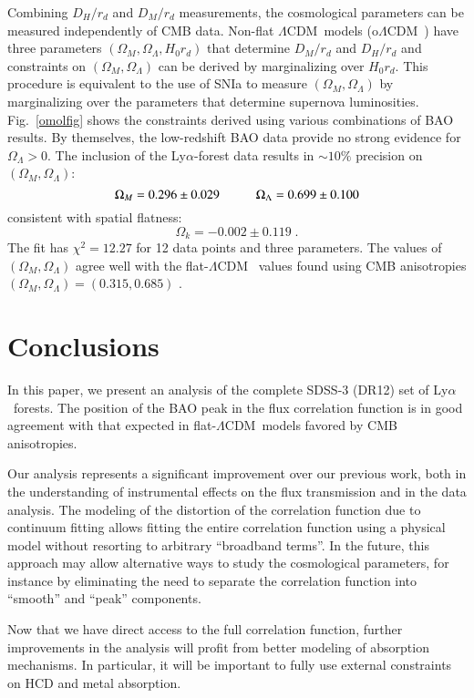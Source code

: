 \documentclass{aa}
\newcommand{\lya}{Ly$\alpha$}
\newcommand{\Lya}{Ly$\alpha$~}
\newcommand{\om}{\Omega_M}
\newcommand{\ol}{\Omega_\Lambda}
\newcommand{\DM}{D_M}
\newcommand{\DHub}{D_H}
\newcommand{\lcdm}{$\Lambda$CDM~}
\begin{document}
Combining $\DHub/r_d$ and  $\DM/r_d$ measurements,
the cosmological parameters can be measured 
independently of CMB data.
Non-flat \lcdm models (o\lcdm) have three parameters $(\om,\ol,H_0r_d)$
that determine $\DM/r_d$ and $\DHub/r_d$  and
constraints on $(\om,\ol)$ can be derived by marginalizing
over $H_0r_d$. 
This procedure is equivalent to the use of SNIa to
measure  $(\om,\ol)$ by marginalizing over the parameters
that determine supernova luminosities.
Fig.~\ref{omolfig} shows the constraints derived using various
combinations of BAO results.
By themselves, the low-redshift BAO data
provide no strong  evidence for $\ol>0$.
The inclusion of the \lya-forest data results in $\sim10\%$ precision
on $(\om,\ol)$:
\begin{equation}
\om=0.296 \pm 0.029  \hspace*{10mm}
\ol=0.699 \pm 0.100
\end{equation}
consistent with spatial flatness:
\begin{equation}
\Omega_k = -0.002 \pm 0.119 \;.
\end{equation}
The fit has $\chi^2=12.27$ for 12 data points and three parameters.
The values of $(\om,\ol)$ agree well with the flat-\lcdm
values found using CMB anisotropies $(\om,\ol)=(0.315,0.685)$
\citep{2016A&A...594A..13P}.

\section{Conclusions}
\label{conclusionssec}

In this paper, we present an analysis of the complete SDSS-3
(DR12) set of \Lya forests. The position of the BAO peak in the
flux correlation function is in good agreement with that expected
in flat-\lcdm models favored by CMB anisotropies.

Our analysis represents a significant improvement over our previous
work, both in the understanding of instrumental effects on  the
flux transmission and in the data analysis.
The modeling of the distortion of the correlation function due
to continuum fitting allows fitting the
entire correlation function using a physical model without
resorting to arbitrary ``broadband terms''.
In the future, this approach
may allow alternative ways to study the cosmological parameters, for
instance by eliminating the need to separate the correlation
function into ``smooth'' and ``peak'' components.

Now that we have direct access to the full correlation function,
further improvements in the analysis will profit from better
modeling of absorption mechanisms.  In particular, it will be important
to fully use external constraints on HCD and metal absorption.
\end{document}
